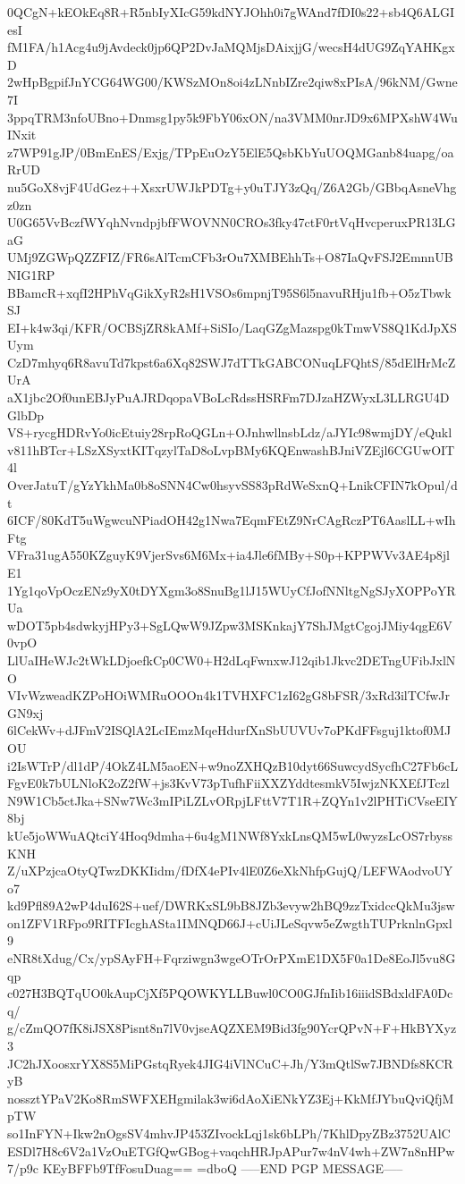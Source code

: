 0QCgN+kEOkEq8R+R5nbIyXIcG59kdNYJOhh0i7gWAnd7fDI0s22+sb4Q6ALGIesI
fM1FA/h1Acg4u9jAvdeck0jp6QP2DvJaMQMjsDAixjjG/wecsH4dUG9ZqYAHKgxD
2wHpBgpifJnYCG64WG00/KWSzMOn8oi4zLNnbIZre2qiw8xPIsA/96kNM/Gwne7I
3ppqTRM3nfoUBno+Dnmsg1py5k9FbY06xON/na3VMM0nrJD9x6MPXshW4WuINxit
z7WP91gJP/0BmEnES/Exjg/TPpEuOzY5ElE5QsbKbYuUOQMGanb84uapg/oaRrUD
nu5GoX8vjF4UdGez++XsxrUWJkPDTg+y0uTJY3zQq/Z6A2Gb/GBbqAsneVhgz0zn
U0G65VvBczfWYqhNvndpjbfFWOVNN0CROs3fky47ctF0rtVqHvcperuxPR13LGaG
UMj9ZGWpQZZFIZ/FR6sAlTcmCFb3rOu7XMBEhhTs+O87IaQvFSJ2EmnnUBNIG1RP
BBamcR+xqfI2HPhVqGikXyR2sH1VSOs6mpnjT95S6l5navuRHju1fb+O5zTbwkSJ
EI+k4w3qi/KFR/OCBSjZR8kAMf+SiSIo/LaqGZgMazspg0kTmwVS8Q1KdJpXSUym
CzD7mhyq6R8avuTd7kpst6a6Xq82SWJ7dTTkGABCONuqLFQhtS/85dElHrMcZUrA
aX1jbc2Of0unEBJyPuAJRDqopaVBoLcRdssHSRFm7DJzaHZWyxL3LLRGU4DGlbDp
VS+rycgHDRvYo0icEtuiy28rpRoQGLn+OJnhwllnsbLdz/aJYIc98wmjDY/eQukl
v811hBTcr+LSzXSyxtKITqzylTaD8oLvpBMy6KQEnwashBJniVZEjl6CGUwOIT4l
OverJatuT/gYzYkhMa0b8oSNN4Cw0hsyvSS83pRdWeSxnQ+LnikCFIN7kOpul/dt
6ICF/80KdT5uWgwcuNPiadOH42g1Nwa7EqmFEtZ9NrCAgRczPT6AaslLL+wIhFtg
VFra31ugA550KZguyK9VjerSvs6M6Mx+ia4Jle6fMBy+S0p+KPPWVv3AE4p8jlE1
1Yg1qoVpOczENz9yX0tDYXgm3o8SnuBg1lJ15WUyCfJofNNltgNgSJyXOPPoYRUa
wDOT5pb4sdwkyjHPy3+SgLQwW9JZpw3MSKnkajY7ShJMgtCgojJMiy4qgE6V0vpO
LlUaIHeWJc2tWkLDjoefkCp0CW0+H2dLqFwnxwJ12qib1Jkvc2DETngUFibJxlNO
VIvWzweadKZPoHOiWMRuOOOn4k1TVHXFC1zI62gG8bFSR/3xRd3ilTCfwJrGN9xj
6lCekWv+dJFmV2ISQlA2LcIEmzMqeHdurfXnSbUUVUv7oPKdFFsguj1ktof0MJOU
i2IsWTrP/dl1dP/4OkZ4LM5aoEN+w9noZXHQzB10dyt66SuwcydSycfhC27Fb6cL
FgvE0k7bULNloK2oZ2fW+js3KvV73pTufhFiiXXZYddtesmkV5IwjzNKXEfJTczl
N9W1Cb5ctJka+SNw7Wc3mIPiLZLvORpjLFttV7T1R+ZQYn1v2lPHTiCVseEIY8bj
kUe5joWWuAQtciY4Hoq9dmha+6u4gM1NWf8YxkLnsQM5wL0wyzsLcOS7rbyssKNH
Z/uXPzjcaOtyQTwzDKKIidm/fDfX4ePIv4lE0Z6eXkNhfpGujQ/LEFWAodvoUYo7
kd9Pfl89A2wP4duI62S+uef/DWRKxSL9bB8JZb3evyw2hBQ9zzTxidccQkMu3jsw
on1ZFV1RFpo9RITFIcghASta1IMNQD66J+cUiJLeSqvw5eZwgthTUPrknlnGpxl9
eNR8tXdug/Cx/ypSAyFH+Fqrziwgn3wgeOTrOrPXmE1DX5F0a1De8EoJl5vu8Gqp
c027H3BQTqUO0kAupCjXf5PQOWKYLLBuwl0CO0GJfnIib16iiidSBdxldFA0Dcq/
g/cZmQO7fK8iJSX8Pisnt8n7lV0vjseAQZXEM9Bid3fg90YcrQPvN+F+HkBYXyz3
JC2hJXoosxrYX8S5MiPGstqRyek4JIG4iVlNCuC+Jh/Y3mQtlSw7JBNDfs8KCRyB
nossztYPaV2Ko8RmSWFXEHgmilak3wi6dAoXiENkYZ3Ej+KkMfJYbuQviQfjMpTW
so1InFYN+Ikw2nOgsSV4mhvJP453ZIvockLqj1sk6bLPh/7KhlDpyZBz3752UAlC
ESDl7H8c6V2a1VzOuETGfQwGBog+vaqchHRJpAPur7w4nV4wh+ZW7n8nHPw7/p9c
KEyBFFb9TfFosuDuag==
=dboQ
-----END PGP MESSAGE-----
